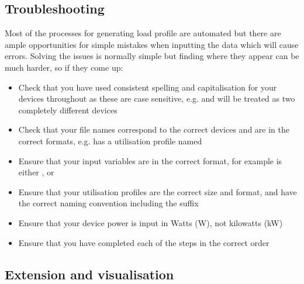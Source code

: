 \documentclass[letterpaper,10pt,english]{sphinxmanual}
\begin{document}
\subsection{Troubleshooting}
\label{\detokenize{load:troubleshooting}}
\sphinxAtStartPar
Most of the processes for generating load profile are automated but
there are ample opportunities for simple mistakes when inputting the
data which will cause errors. Solving the issues is normally simple but
finding where they appear can be much harder, so if they come up:
\begin{itemize}
\item {} 
\sphinxAtStartPar
Check that you have used consistent spelling and capitalisation for your devices throughout as these are case sensitive, e.g.  and  will be treated as two completely different devices

\item {} 
\sphinxAtStartPar
Check that your file names correspond to the correct devices and are in the correct formats, e.g.  has a utilisation profile named 

\item {} 
\sphinxAtStartPar
Ensure that your input variables are in the correct format, for example  is either ,  or 

\item {} 
\sphinxAtStartPar
Ensure that your utilisation profiles are the correct size and format, and have the correct naming convention including the  suffix

\item {} 
\sphinxAtStartPar
Ensure that your device power is input in Watts (W), not kilowatts (kW)

\item {} 
\sphinxAtStartPar
Ensure that you have completed each of the steps in the correct order

\end{itemize}


\subsection{Extension and visualisation}
\label{\detokenize{load:extension-and-visualisation}}
\end{document}
